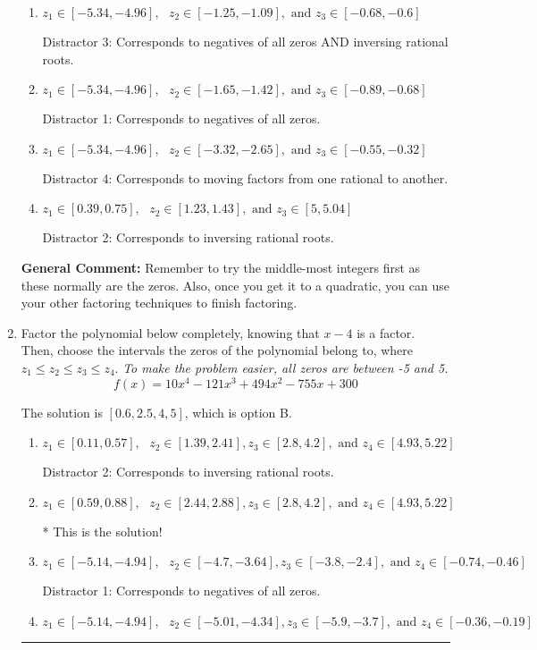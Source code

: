 \documentclass{extbook}[14pt]
\newcommand{\litem}[1]{\item #1

\rule{\textwidth}{0.4pt}}
\begin{document}
\begin{enumerate}
{\begin{enumerate}[label=\Alph*.]
* This is the solution!
\item \( z_1 \in [-5.34, -4.96], \text{   }  z_2 \in [-1.25, -1.09], \text{   and   } z_3 \in [-0.68, -0.6] \)

 Distractor 3: Corresponds to negatives of all zeros AND inversing rational roots.
\item \( z_1 \in [-5.34, -4.96], \text{   }  z_2 \in [-1.65, -1.42], \text{   and   } z_3 \in [-0.89, -0.68] \)

 Distractor 1: Corresponds to negatives of all zeros.
\item \( z_1 \in [-5.34, -4.96], \text{   }  z_2 \in [-3.32, -2.65], \text{   and   } z_3 \in [-0.55, -0.32] \)

 Distractor 4: Corresponds to moving factors from one rational to another.
\item \( z_1 \in [0.39, 0.75], \text{   }  z_2 \in [1.23, 1.43], \text{   and   } z_3 \in [5, 5.04] \)

 Distractor 2: Corresponds to inversing rational roots.
\end{enumerate}

\textbf{General Comment:} Remember to try the middle-most integers first as these normally are the zeros. Also, once you get it to a quadratic, you can use your other factoring techniques to finish factoring.
}
\litem{
Factor the polynomial below completely, knowing that $x-4$ is a factor. Then, choose the intervals the zeros of the polynomial belong to, where $z_1 \leq z_2 \leq z_3 \leq z_4$. \textit{To make the problem easier, all zeros are between -5 and 5.}
\[ f(x) = 10x^{4} -121 x^{3} +494 x^{2} -755 x + 300 \]

The solution is \( [0.6, 2.5, 4, 5] \), which is option B.\begin{enumerate}[label=\Alph*.]
\item \( z_1 \in [0.11, 0.57], \text{   }  z_2 \in [1.39, 2.41], z_3 \in [2.8, 4.2], \text{   and   } z_4 \in [4.93, 5.22] \)

 Distractor 2: Corresponds to inversing rational roots.
\item \( z_1 \in [0.59, 0.88], \text{   }  z_2 \in [2.44, 2.88], z_3 \in [2.8, 4.2], \text{   and   } z_4 \in [4.93, 5.22] \)

* This is the solution!
\item \( z_1 \in [-5.14, -4.94], \text{   }  z_2 \in [-4.7, -3.64], z_3 \in [-3.8, -2.4], \text{   and   } z_4 \in [-0.74, -0.46] \)

 Distractor 1: Corresponds to negatives of all zeros.
\item \( z_1 \in [-5.14, -4.94], \text{   }  z_2 \in [-5.01, -4.34], z_3 \in [-5.9, -3.7], \text{   and   } z_4 \in [-0.36, -0.19] \)


\end{enumerate}}
\end{enumerate}
\end{document}
